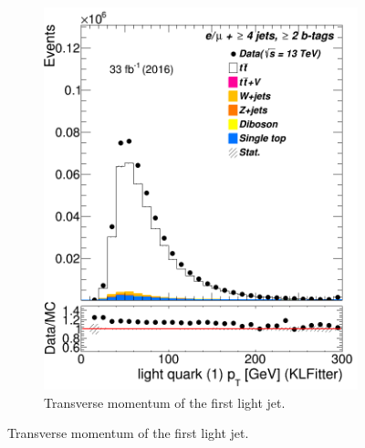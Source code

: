 \begin{figure}
\begin{subfigure}{0.25\textwidth}
	\includegraphics[width=\linewidth]{ControlPlots_emujets_2016_4incl_2incl/klf_lq1_pt_emujets_2016.png}
	\caption{Transverse momentum of the first light jet.} \label{fig:K39}
\end{subfigure}	





\end{figure}

